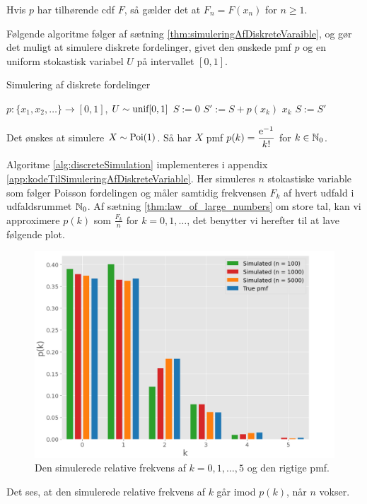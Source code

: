 \begin{rem}
Hvis $p$ har tilhørende cdf $F$, så gælder det at $F_n = F(x_n)$ for $n \geq 1$.
\end{rem}
Følgende algoritme følger af sætning \ref{thm:simuleringAfDiskreteVaraible}, og gør det muligt at simulere diskrete fordelinger, givet den ønskede pmf $p$ og en uniform stokastisk variabel $U$ på intervallet $[0, 1]$.

\begin{algorithm} 
\caption{Simulering af diskrete fordelinger}\label{alg:discreteSimulation} 
\begin{algorithmic}[1] 
 {$p: \{x_1, x_2, \ldots\} \rightarrow [0, 1]$, $U \sim \textnormal{unif}[0, 1]$}
    \State $S := 0$
        \State $S' := S + p(x_k)$ 
         \Return $x_k$
        \EndIf
        \State $S := S'$
    \EndFor
\EndProcedure
\end{algorithmic}
\end{algorithm} 



\begin{exmp} \label{exmp:simuleringAfDiskreteVariable}
    Det ønskes at simulere $X \sim \textnormal{Poi}(1)$. Så har $X$ pmf $p(k) = \dfrac{\mathrm{e}^{-1}}{k!}$ for $k \in \mathbb{N}_0$.
    
    Algoritme \ref{alg:discreteSimulation} implementeres i appendix \ref{app:kodeTilSimuleringAfDiskreteVariable}. Her simuleres $n$ stokastiske variable som følger Poisson fordelingen og måler samtidig frekvensen $F_k$ af hvert udfald i udfaldsrummet $\mathbb{N}_0$.
    Af sætning \ref{thm:law_of_large_numbers} om store tal, kan vi approximere $p(k)$ som $\frac{F_k}{n}$ for $k = 0, 1, \ldots$, det benytter vi herefter til at lave følgende plot. 
    \begin{figure}[H]
        \centering
        \includegraphics[scale=0.5]{fig/img/poisson.png} 
        \caption{Den simulerede relative frekvens af $k = 0, 1, \ldots, 5$ og den rigtige pmf.}
        \label{fig:simuleringAfPoisson}
    \end{figure}
    Det ses, at den simulerede relative frekvens af $k$ går imod $p(k)$, når $n$ vokser.
\end{exmp}

